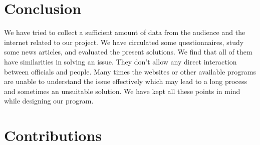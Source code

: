 \documentclass[acmtog]{acmart}
\begin{document}
\section*{Conclusion}
We have tried to collect a sufficient amount of data from the audience and the internet related to our project. We have circulated some questionnaires, study some news articles, and evaluated the present solutions. We find that all of them have similarities in solving an issue. They don’t allow any direct interaction between officials and people. Many times the websites or other available programs are unable to understand the issue effectively which may lead to a long process and sometimes an unsuitable solution. We have kept all these points in mind while designing our program.


\clearpage
\section*{Contributions}
\end{document}
